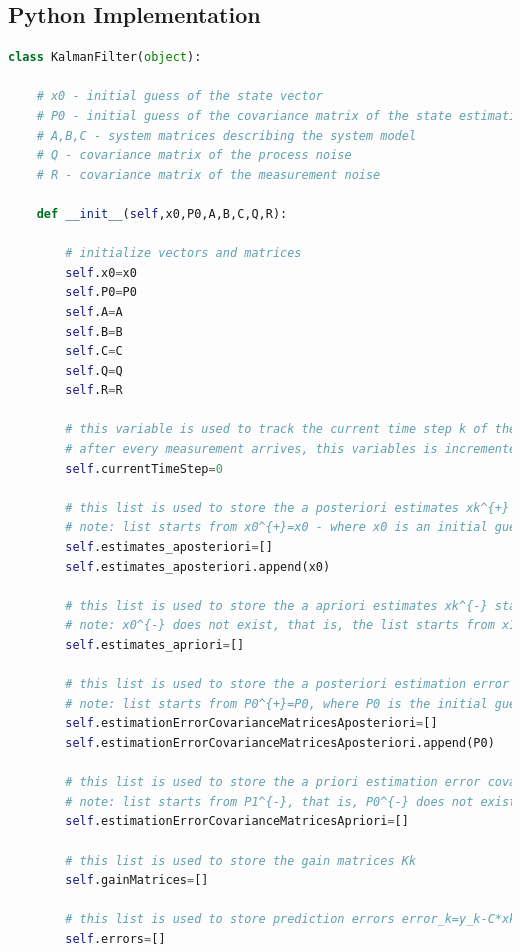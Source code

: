 \subsection{Python Implementation}
\begin{lstlisting}[language=Python]
	class KalmanFilter(object):
    
    # x0 - initial guess of the state vector 
    # P0 - initial guess of the covariance matrix of the state estimation error
    # A,B,C - system matrices describing the system model
    # Q - covariance matrix of the process noise 
    # R - covariance matrix of the measurement noise
    
    def __init__(self,x0,P0,A,B,C,Q,R):
        
        # initialize vectors and matrices
        self.x0=x0
        self.P0=P0
        self.A=A
        self.B=B
        self.C=C
        self.Q=Q
        self.R=R
        
        # this variable is used to track the current time step k of the estimator 
        # after every measurement arrives, this variables is incremented for +1 
        self.currentTimeStep=0
        
        # this list is used to store the a posteriori estimates xk^{+} starting from the initial estimate 
        # note: list starts from x0^{+}=x0 - where x0 is an initial guess of the estimate
        self.estimates_aposteriori=[]
        self.estimates_aposteriori.append(x0)
        
        # this list is used to store the a apriori estimates xk^{-} starting from x1^{-}
        # note: x0^{-} does not exist, that is, the list starts from x1^{-}
        self.estimates_apriori=[]
        
        # this list is used to store the a posteriori estimation error covariance matrices Pk^{+}
        # note: list starts from P0^{+}=P0, where P0 is the initial guess of the covariance
        self.estimationErrorCovarianceMatricesAposteriori=[]
        self.estimationErrorCovarianceMatricesAposteriori.append(P0)
        
        # this list is used to store the a priori estimation error covariance matrices Pk^{-}
        # note: list starts from P1^{-}, that is, P0^{-} does not exist
        self.estimationErrorCovarianceMatricesApriori=[]
        
        # this list is used to store the gain matrices Kk
        self.gainMatrices=[]
         
        # this list is used to store prediction errors error_k=y_k-C*xk^{-}
        self.errors=[]
        

\end{lstlisting}
